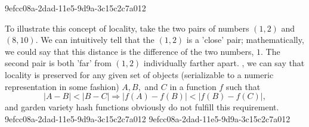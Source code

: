 \documentclass[12pt]{article}
\begin{document}
9efcc08a-2dad-11e5-9d9a-3c15c2c7a012\par To illustrate this concept of locality, take the two pairs of numbers $(1,2)$ and $(8,10)$. We can intuitively tell that the $(1,2)$ is a 'close' pair; mathematically, we could say that this distance is the difference of the two numbers, $1$. The second pair is both 'far' from $(1,2)$ individually farther apart. , we can say that locality is preserved for any given set of objects (serializable to a numeric representation in some fashion) $A,B,$ and $C$ in a function $f$ such that
\begin{equation}
|A-B| < |B-C| \Rightarrow |f(A)-f(B)| < |f(B) - f(C)|,
\end{equation}
and garden variety hash functions obviously do not fulfill this requirement.
9efcc08a-2dad-11e5-9d9a-3c15c2c7a012
9efcc08a-2dad-11e5-9d9a-3c15c2c7a012\printbibliography
\end{document}
